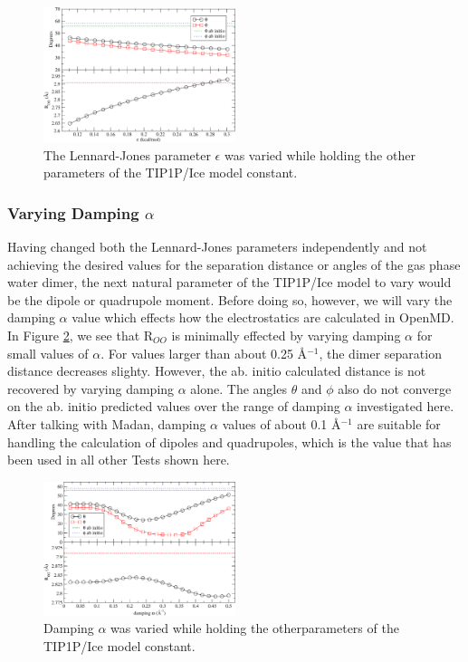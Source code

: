 \documentclass[aps, jcp, prl, reprint, groupedaddress, superscriptaddress, twocolumn]{revtex4-1}
\begin{document}
\begin{figure}[h!]
\includegraphics[width = 0.5\textwidth]{Test2_plot.pdf}
\caption{\label{fig:Epsilon} The Lennard-Jones parameter $\epsilon$ was varied while holding the other parameters of the TIP1P/Ice model constant.}
\end{figure}

\subsubsection{Varying Damping $\alpha$}
Having changed both the Lennard-Jones parameters independently and not 
achieving the desired values for the separation distance or angles of the
gas phase water dimer, the next natural parameter of the TIP1P/Ice model to 
vary would be the dipole or quadrupole moment. Before doing so, however, 
we will vary the damping $\alpha$ value which effects how the electrostatics
are calculated in OpenMD\cite{openmd}. In Figure \ref{fig:Dalpha}, we see that
R$_{OO}$ is minimally effected by varying damping $\alpha$ for small values of
$\alpha$. For values larger than about 0.25 \AA$^{-1}$, the dimer separation
distance decreases slighty. However, the ab. initio calculated distance
is not recovered by varying damping $\alpha$ alone. The angles $\theta$ and
$\phi$ also do not converge on the ab. initio predicted values over the range
of damping $\alpha$ investigated here. After talking with Madan, damping
$\alpha$ values of about 0.1 \AA$^{-1}$ are suitable for handling the 
calculation of dipoles and quadrupoles, which is the value that has been used
in all other Tests shown here.

\begin{figure}[h!]
\includegraphics[width = 0.5\textwidth]{Test3_plot.pdf}
\caption{\label{fig:Dalpha} Damping $\alpha$ was varied while holding the otherparameters of the TIP1P/Ice model constant.}
\end{figure}
\end{document}

